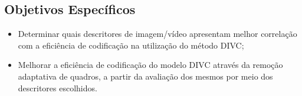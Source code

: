 \subsection*{Objetivos Específicos}

    \begin{itemize}
        \item Determinar quais descritores de imagem/vídeo apresentam melhor correlação com a eficiência de codificação na utilização do método \ac{DIVC};
        \item Melhorar a eficiência de codificação do modelo \ac{DIVC} através da remoção adaptativa de quadros, a partir da avaliação dos mesmos por meio dos descritores escolhidos.
    \end{itemize}
